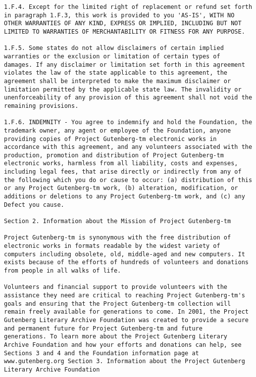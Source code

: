 \documentclass{book}[2021/07/26]
\begin{document}
\begin{mainmatter}
\begin{spacing}{1.3}
\begin{verbatim}
1.F.4. Except for the limited right of replacement or refund set forth
in paragraph 1.F.3, this work is provided to you 'AS-IS', WITH NO
OTHER WARRANTIES OF ANY KIND, EXPRESS OR IMPLIED, INCLUDING BUT NOT
LIMITED TO WARRANTIES OF MERCHANTABILITY OR FITNESS FOR ANY PURPOSE.

1.F.5. Some states do not allow disclaimers of certain implied
warranties or the exclusion or limitation of certain types of
damages. If any disclaimer or limitation set forth in this agreement
violates the law of the state applicable to this agreement, the
agreement shall be interpreted to make the maximum disclaimer or
limitation permitted by the applicable state law. The invalidity or
unenforceability of any provision of this agreement shall not void the
remaining provisions.

1.F.6. INDEMNITY - You agree to indemnify and hold the Foundation, the
trademark owner, any agent or employee of the Foundation, anyone
providing copies of Project Gutenberg-tm electronic works in
accordance with this agreement, and any volunteers associated with the
production, promotion and distribution of Project Gutenberg-tm
electronic works, harmless from all liability, costs and expenses,
including legal fees, that arise directly or indirectly from any of
the following which you do or cause to occur: (a) distribution of this
or any Project Gutenberg-tm work, (b) alteration, modification, or
additions or deletions to any Project Gutenberg-tm work, and (c) any
Defect you cause.

Section 2. Information about the Mission of Project Gutenberg-tm

Project Gutenberg-tm is synonymous with the free distribution of
electronic works in formats readable by the widest variety of
computers including obsolete, old, middle-aged and new computers. It
exists because of the efforts of hundreds of volunteers and donations
from people in all walks of life.

Volunteers and financial support to provide volunteers with the
assistance they need are critical to reaching Project Gutenberg-tm's
goals and ensuring that the Project Gutenberg-tm collection will
remain freely available for generations to come. In 2001, the Project
Gutenberg Literary Archive Foundation was created to provide a secure
and permanent future for Project Gutenberg-tm and future
generations. To learn more about the Project Gutenberg Literary
Archive Foundation and how your efforts and donations can help, see
Sections 3 and 4 and the Foundation information page at
www.gutenberg.org Section 3. Information about the Project Gutenberg
Literary Archive Foundation


\end{verbatim}
\end{spacing}
\end{mainmatter}
\end{document}
